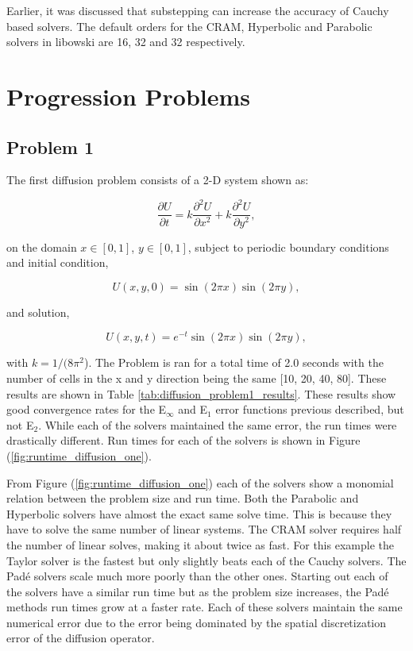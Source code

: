 Earlier, it was discussed that substepping can increase the accuracy of Cauchy based solvers. The default orders for the CRAM, Hyperbolic and Parabolic solvers in libowski are 16, 32 and 32 respectively. 

\section{Progression Problems}
\subsection{Problem 1}
The first diffusion problem consists of a 2-D system shown as:

\begin{equation}
    \frac{\partial U}{\partial t} = k\frac{\partial^{2}U}{\partial x^{2}} + k\frac{\partial^{2}U}{\partial y^{2}},
\end{equation}

\noindent on the domain $x \in [0,1]$, $y \in [0,1]$, subject to periodic boundary conditions and initial condition,


\begin{equation}
    U(x,y,0) = \sin(2\pi x)\sin(2\pi y),
\end{equation}

\noindent and solution,

\begin{equation}
    U(x,y,t) = e^{-t}\sin(2\pi x)\sin(2\pi y),
\end{equation}

\noindent with $k = 1/(8\pi^{2}$). The Problem is ran for a total time of 2.0 seconds with the number of cells in the x and y direction being the same [10, 20, 40, 80]. These results are shown in Table \ref{tab:diffusion_problem1_results}. These results show good convergence rates for the E${}_{\infty}$ and E${}_{1}$ error functions previous described, but not E${}_{2}$. While each of the solvers maintained the same error, the run times were drastically different. Run times for each of the solvers is shown in Figure (\ref{fig:runtime_diffusion_one}).

From Figure (\ref{fig:runtime_diffusion_one}) each of the solvers show a monomial relation between the problem size and run time. Both the Parabolic and Hyperbolic solvers have almost the exact same solve time. This is because they have to solve the same number of linear systems. The CRAM solver requires half the number of linear solves, making it about twice as fast. For this example the Taylor solver is the fastest but only slightly beats each of the Cauchy solvers. The Pad\'e solvers scale much more poorly than the other ones. Starting out each of the solvers have a similar run time but as the problem size increases, the Pad\'e methods run times grow at a faster rate. Each of these solvers maintain the same numerical error due to the error being dominated by the spatial discretization error of the diffusion operator. 

